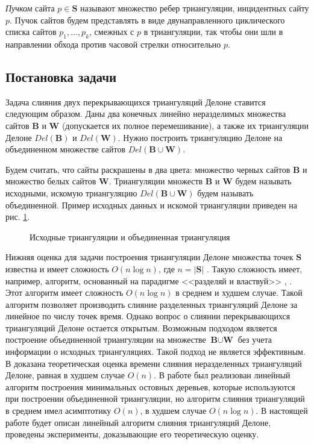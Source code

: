 \documentclass[12pt]{article}
\begin{document}
{\itshape Пучком} сайта $p \in \textbf{S}$ называют множество ребер триангуляции, инцидентных сайту $p$.
Пучок сайтов будем представлять в виде двунаправленного циклического списка сайтов $p_1, \ldots, p_k$,
смежных с $p$ в триангуляции, так чтобы они шли в направлении обхода против часовой стрелки относительно $p$.

\subsection{Постановка задачи}
Задача слияния двух перекрывающихся триангуляций Делоне ставится следующим образом.
Даны два конечных линейно неразделимых множества сайтов $\textbf{B}$ и $\textbf{W}$ (допускается их полное перемешивание),
а также их триангуляции Делоне $Del(\textbf{B})$ и $Del(\textbf{W})$.
Нужно построить триангуляцию Делоне на объединенном множестве сайтов $Del(\textbf{B} \cup \textbf{W})$.

Будем считать, что сайты раскрашены в два цвета: множество черных сайтов $\textbf{B}$ и множество белых сайтов $\textbf{W}$.
Триангуляции множеств $\textbf{B}$ и $\textbf{W}$ будем называть исходными,
искомую триангуляцию $Del(\textbf{B} \cup \textbf{W})$ будем называть объединенной.
Пример исходных данных и искомой триангуляции приведен на рис. \ref{pic:model_data}.

\begin{figure}[htb!]
	\begin{minipage}[h]{0.49\linewidth}
	\end{minipage}
	\hfill
	\begin{minipage}[h]{0.49\linewidth}
	\end{minipage}
	\caption{Исходные триангуляции и объединенная триангуляция}
	\label{pic:model_data}
\end{figure}

Нижняя оценка для задачи построения триангуляции Делоне множества точек $\textbf{S}$ известна
и имеет сложность $O(n\log n)$, где $n = |\textbf{S}|$ \cite[лекции 10-11]{Lectures}.
Такую сложность имеет, например, алгоритм, основанный на парадигме <<разделяй и властвуй>> \cite[стр.44-45]{Skvortsov}, \cite{Lee}.
Этот алгоритм имеет сложность $O(n\log n)$ в среднем и худшем случае.
Такой алгоритм позволяет производить слияние разделенных триангуляций Делоне за линейное по числу точек время.
Однако вопрос о слиянии перекрывающихся триангуляций Делоне остается открытым.
Возможным подходом является построение объединенной триангуляции на множестве $\textbf{B} \cup \textbf{W}$
без учета информации о исходных триангуляциях.
Такой подход не является эффективным.
В \cite{MestOverlap} доказана теоретическая оценка времени слияния неразделенных триангуляций Делоне, равная в худшем случае $O(n)$.
В работе \cite{Dyshkant} был реализован линейный алгоритм построения минимальных остовных деревьев,
которые используются при построении объединенной триангуляции, 
но алгоритм слияния триангуляций в среднем имел асимптотику $O(n)$, в худшем случае $O(n\log n)$.
В настоящей работе будет описан линейный алгоритм слияния триангуляций Делоне,
проведены эксперименты, доказывающие его теоретическую оценку.
\end{document}
